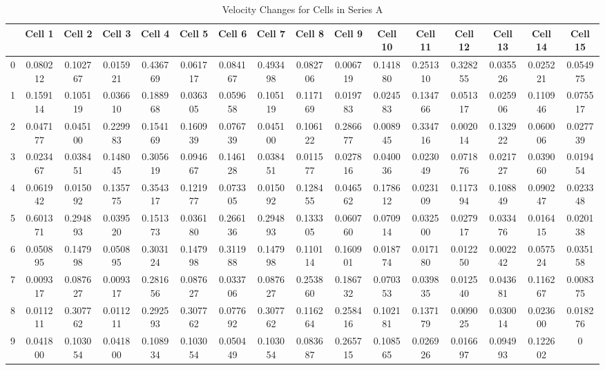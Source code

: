 \documentclass{article}
\begin{document}
\begin{landscape} %
\begin{table}[htbp]
\centering
\caption{Velocity Changes for Cells in Series A }
\label{tab:velocity_changes}
\begin{tabular}{cccccccccccccccc}
\toprule
 & \textbf{Cell 1} & \textbf{Cell 2} & \textbf{Cell 3} & \textbf{Cell 4} & \textbf{Cell 5} & \textbf{Cell 6} & \textbf{Cell 7} & \textbf{Cell 8} & \textbf{Cell 9} & \textbf{Cell 10} & \textbf{Cell 11} & \textbf{Cell 12} & \textbf{Cell 13} & \textbf{Cell 14} & \textbf{Cell 15} \\
\midrule
0 & 0.080212 & 0.102767 & 0.015921 & 0.436769 & 0.061717 & 0.084167 & 0.493498 & 0.082706 & 0.006719 & 0.141880 & 0.251310 & 0.328255 & 0.035526 & 0.025221 & 0.054975 \\
1 & 0.159114 & 0.105119 & 0.036610 & 0.188968 & 0.036305 & 0.059658 & 0.105119 & 0.117169 & 0.019783 & 0.024583 & 0.134766 & 0.051317 & 0.025906 & 0.110946 & 0.075517 \\
2 & 0.047177 & 0.045100 & 0.229983 & 0.154169 & 0.160939 & 0.076739 & 0.045100 & 0.106122 & 0.286677 & 0.008945 & 0.334716 & 0.002014 & 0.132922 & 0.060006 & 0.027739 \\
3 & 0.023467 & 0.038451 & 0.148045 & 0.305619 & 0.094667 & 0.146128 & 0.038451 & 0.011577 & 0.027816 & 0.040036 & 0.023049 & 0.071876 & 0.021727 & 0.039060 & 0.019454 \\
4 & 0.061942 & 0.015092 & 0.135775 & 0.354317 & 0.121977 & 0.073305 & 0.015092 & 0.128455 & 0.046562 & 0.178612 & 0.023109 & 0.117394 & 0.108849 & 0.090247 & 0.023348 \\
5 & 0.601371 & 0.294893 & 0.039520 & 0.151373 & 0.036180 & 0.266136 & 0.294893 & 0.133305 & 0.060760 & 0.070914 & 0.032500 & 0.027917 & 0.033476 & 0.016415 & 0.020138 \\
6 & 0.050895 & 0.147998 & 0.050895 & 0.303124 & 0.147998 & 0.311988 & 0.147998 & 0.110114 & 0.160901 & 0.018774 & 0.017180 & 0.012250 & 0.002242 & 0.057524 & 0.035158 \\
7 & 0.009317 & 0.087627 & 0.009317 & 0.281656 & 0.087627 & 0.033706 & 0.087627 & 0.253860 & 0.186732 & 0.070353 & 0.039835 & 0.012540 & 0.043681 & 0.116267 & 0.008375 \\
8 & 0.011211 & 0.307762 & 0.011211 & 0.292593 & 0.307762 & 0.077692 & 0.307762 & 0.116264 & 0.258416 & 0.102181 & 0.137179 & 0.009025 & 0.030014 & 0.023600 & 0.018276 \\
9 & 0.041800 & 0.103054 & 0.041800 & 0.108934 & 0.103054 & 0.050449 & 0.103054 & 0.083687 & 0.265715 & 0.108565 & 0.026926 & 0.016697 & 0.094993 & 0.122602 & 0 \\

\end{tabular}
\end{table}
\end{landscape}
\end{document}
